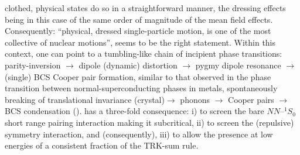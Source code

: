 { clothed, physical states do so in a straightforward manner, the dressing effects being in this case of the same order of magnitude of the mean field effects. Consequently: ``physical,  dressed single-particle motion, is 
 one of the most collective of nuclear  motions'', seems to be  the right statement. Within this context, one can point to a tumbling-like chain of incipient phase transitions: parity-inversion $\to$ dipole (dynamic) distortion $\to$ pygmy dipole resonance $\to$ (single) BCS Cooper pair formation, similar to that observed in the phase transition between normal-superconducting phases in metals, spontaneously breaking of translational invariance (crystal)$\to$ phonons $\to$ Cooper pairs $\to$BCS condensation (\cite{Nambu:91,Broglia:19}).} has a three-fold consequence: i) to screen the bare $NN$--$^1S_0$ short  range pairing interaction making it subcritical, ii) to screen the (repulsive) symmetry interaction, and (consequently), iii) to allow the presence at low energies of a consistent fraction of the TRK-sum rule.



